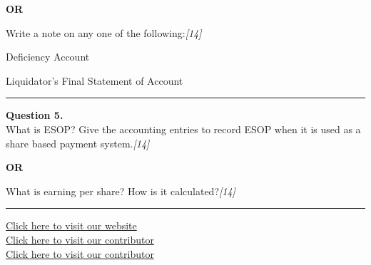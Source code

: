 \documentclass[11pt,a4paper]{article}
\newcommand{\pts}[1]{\hfill   \textit{[#1]}}
\begin{document}
\centerline{   \textbf{OR}}




\noindent Write a note on any one of the following:\pts{14}

\begin{parts}
  \item Deficiency Account
  \item Liquidator's Final Statement of Account
\end{parts}

\medskip\rule{\linewidth}{0.2pt}




\noindent   \textbf{Question 5.} \\
What is ESOP? Give the accounting entries to record ESOP when it is used as a share based payment system.\pts{14}

\centerline{   \textbf{OR}}




\noindent What is earning per share? How is it calculated?\pts{14}

\vfill
\rule{\linewidth}{0.4pt}

\begin{center}\small
\href{https://bhu-exam.vercel.app/}{Click here to visit our website}\\[4pt]
\href{https://me-aryan.vercel.app/}{Click here to visit our contributor}\\[4pt]
\href{https://quashan-me.vercel.app/}{Click here to visit our contributor}
\end{center}
\end{document}

